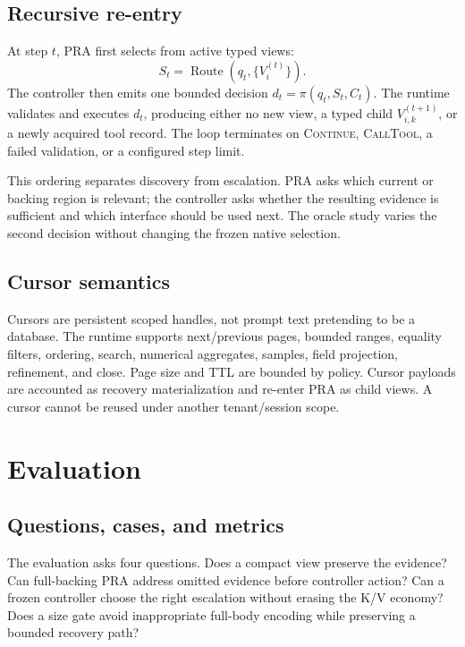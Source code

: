 \documentclass[11pt]{article}
\begin{document}
\subsection{Recursive re-entry}

At step $t$, PRA first selects from active typed views:
\begin{equation}
S_t=\operatorname{Route}(q_t,\{V_i^{(t)}\}).
\end{equation}
The controller then emits one bounded decision
$d_t=\pi(q_t,S_t,C_t)$. The runtime validates and executes $d_t$, producing
either no new view, a typed child $V_{i,k}^{(t+1)}$, or a newly acquired tool
record. The loop terminates on \textsc{Continue}, \textsc{CallTool}, a failed
validation, or a configured step limit.

This ordering separates discovery from escalation. PRA asks which current or
backing region is relevant; the controller asks whether the resulting evidence
is sufficient and which interface should be used next. The oracle study varies
the second decision without changing the frozen native selection.

\subsection{Cursor semantics}

Cursors are persistent scoped handles, not prompt text pretending to be a
database. The runtime supports next/previous pages, bounded ranges, equality
filters, ordering, search, numerical aggregates, samples, field projection,
refinement, and close. Page size and TTL are bounded by policy. Cursor payloads
are accounted as recovery materialization and re-enter PRA as child views. A
cursor cannot be reused under another tenant/session scope.

\section{Evaluation}

\subsection{Questions, cases, and metrics}

The evaluation asks four questions. Does a compact view preserve the evidence?
Can full-backing PRA address omitted evidence before controller action? Can a
frozen controller choose the right escalation without erasing the K/V economy?
Does a size gate avoid inappropriate full-body encoding while preserving a
bounded recovery path?
\end{document}
